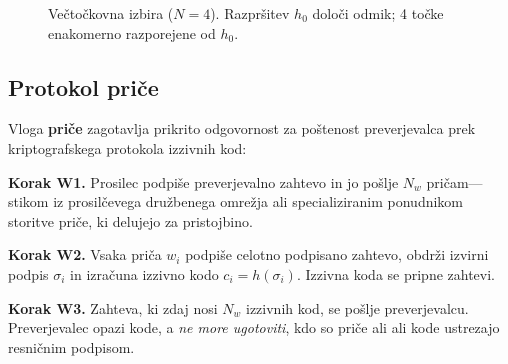 \documentclass[11pt,a4paper,twocolumn]{article}
\begin{document}
\begin{figure}[ht]
\centering
{}
\caption{Večtočkovna izbira ($N{=}4$). Razpršitev $h_0$ določi odmik; 4 točke enakomerno razporejene od $h_0$.}
\label{fig:multipoint}
\end{figure}

\subsection{Protokol priče}

Vloga \textbf{priče} zagotavlja prikrito odgovornost za poštenost preverjevalca prek kriptografskega protokola izzivnih kod:

\textbf{Korak W1.} Prosilec podpiše preverjevalno zahtevo in jo pošlje $N_w$ pričam---stikom iz prosilčevega družbenega omrežja ali specializiranim ponudnikom storitve priče, ki delujejo za pristojbino.

\textbf{Korak W2.} Vsaka priča $w_i$ podpiše celotno podpisano zahtevo, obdrži izvirni podpis $\sigma_i$ in izračuna izzivno kodo $c_i = h(\sigma_i)$. Izzivna koda se pripne zahtevi.

\textbf{Korak W3.} Zahteva, ki zdaj nosi $N_w$ izzivnih kod, se pošlje preverjevalcu. Preverjevalec opazi kode, a \emph{ne more ugotoviti}, kdo so priče ali ali kode ustrezajo resničnim podpisom.
\end{document}
